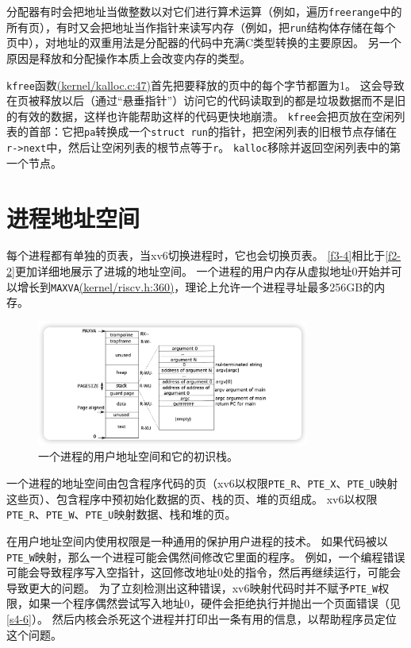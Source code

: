 分配器有时会把地址当做整数以对它们进行算术运算（例如，遍历\texttt{freerange}中的所有页），有时又会把地址当作指针来读写内存（例如，把\texttt{run}结构体存储在每个页中），对地址的双重用法是分配器的代码中充满C类型转换的主要原因。
另一个原因是释放和分配操作本质上会改变内存的类型。

\texttt{kfree}函数\href{https://github.com/mit-pdos/xv6-riscv/blob/riscv/kernel/kalloc.c#L47}{(kernel/kalloc.c:47)}首先把要释放的页中的每个字节都置为1。
这会导致在页被释放以后（通过“悬垂指针”）访问它的代码读取到的都是垃圾数据而不是旧的有效的数据，这样也许能帮助这样的代码更快地崩溃。
\texttt{kfree}会把页放在空闲列表的首部：它把\texttt{pa}转换成一个\texttt{struct run}的指针，把空闲列表的旧根节点存储在\texttt{r->next}中，然后让空闲列表的根节点等于\texttt{r}。
\texttt{kalloc}移除并返回空闲列表中的第一个节点。

\section{进程地址空间}
每个进程都有单独的页表，当xv6切换进程时，它也会切换页表。
\autoref{f3-4}相比于\autoref{f2-2}更加详细地展示了进城的地址空间。
一个进程的用户内存从虚拟地址0开始并可以增长到\texttt{MAXVA}\href{https://github.com/mit-pdos/xv6-riscv/blob/riscv/kernel/riscv.h#L360}{(kernel/riscv.h:360)}，理论上允许一个进程寻址最多256GB的内存。

\begin{figure}[htbp]
    \centering
    \includegraphics[width=0.8\textwidth]{../imgs/f3-4.png}
    \caption{一个进程的用户地址空间和它的初识栈。}
    \label{f3-4}
\end{figure}

一个进程的地址空间由包含程序代码的页（xv6以权限\texttt{PTE\_R}、\texttt{PTE\_X}、\texttt{PTE\_U}映射这些页）、包含程序中预初始化数据的页、栈的页、堆的页组成。
xv6以权限\texttt{PTE\_R}、\texttt{PTE\_W}、\texttt{PTE\_U}映射数据、栈和堆的页。

在用户地址空间内使用权限是一种通用的保护用户进程的技术。
如果代码被以\texttt{PTE\_W}映射，那么一个进程可能会偶然间修改它里面的程序。
例如，一个编程错误可能会导致程序写入空指针，这回修改地址0处的指令，然后再继续运行，可能会导致更大的问题。
为了立刻检测出这种错误，xv6映射代码时并不赋予\texttt{PTE\_W}权限，如果一个程序偶然尝试写入地址0，硬件会拒绝执行并抛出一个页面错误（见\autoref{s4-6}）。
然后内核会杀死这个进程并打印出一条有用的信息，以帮助程序员定位这个问题。

